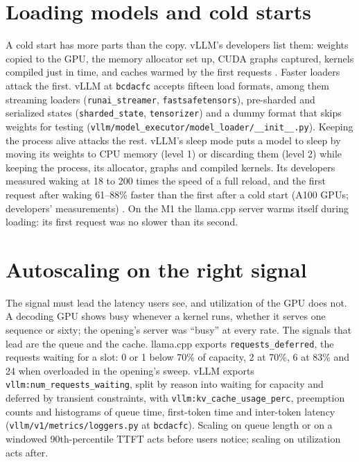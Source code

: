 \section{Loading models and cold starts}

A cold start has more parts than the copy. vLLM's developers list them: weights
copied to the GPU, the memory allocator set up, CUDA graphs captured, kernels
compiled just in time, and caches warmed by the first requests
\cite{vllm2025sleepmode}. Faster loaders attack the first. vLLM at
\texttt{bcdacfc} accepts fifteen load formats, among them streaming loaders
(\texttt{runai\_streamer}, \texttt{fastsafetensors}), pre-sharded and serialized
states (\texttt{sharded\_state}, \texttt{tensorizer}) and a dummy format that
skips weights for testing (\texttt{vllm/model\_executor/model\_loader/\_\_init\_\_.py}).
Keeping the process alive attacks the rest. vLLM's sleep mode puts a model to
sleep by moving its weights to CPU memory (level 1) or discarding them (level
2) while keeping the process, its allocator, graphs and compiled kernels. Its
developers measured waking at 18 to 200 times the speed of a full reload, and
the first request after waking 61--88\% faster than the first after a cold start
(A100 GPUs; developers' measurements) \cite{vllm2025sleepmode}. On the M1 the
llama.cpp server warms itself during loading: its first request was no slower
than its second.

\section{Autoscaling on the right signal}

The signal must lead the latency users see, and utilization of the GPU does not.
A decoding GPU shows busy whenever a kernel runs, whether it serves one
sequence or sixty; the opening's server was ``busy'' at every rate. The signals
that lead are the queue and the cache. llama.cpp exports
\texttt{requests\_deferred}, the requests waiting for a slot: 0 or 1 below 70\%
of capacity, 2 at 70\%, 6 at 83\% and 24 when overloaded in the opening's sweep.
vLLM exports \texttt{vllm:num\_requests\_waiting}, split by reason into waiting for
capacity and deferred by transient constraints, with
\texttt{vllm:kv\_cache\_usage\_perc}, preemption counts and histograms of queue
time, first-token time and inter-token latency (\texttt{vllm/v1/metrics/loggers.py}
at \texttt{bcdacfc}). Scaling on queue length or on a windowed 90th-percentile
TTFT acts before users notice; scaling on utilization acts after.

